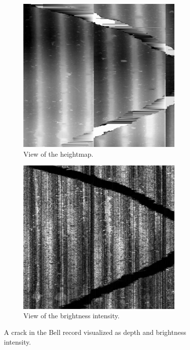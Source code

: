 \begin{figure}[!ht]
    \centering
    \begin{subfigure}[t]{0.45\textwidth}
    \centering
    \includegraphics[width=0.9\textwidth]{images/bell-crack-raw}
    \caption{View of the heightmap.}
    \label{fig:crackdepth}
    \end{subfigure}
    \begin{subfigure}[t]{0.45\textwidth}
    \centering
    \includegraphics[width=0.9\textwidth]{images/bell-crack-bri}
    \caption{View of the brightness intensity.}
    \label{fig:crackbri}
    \end{subfigure}
    \caption{A crack in the Bell record visualized as depth and brightness intensity.}
    \label{fig:crackdepthbri}
\end{figure}

